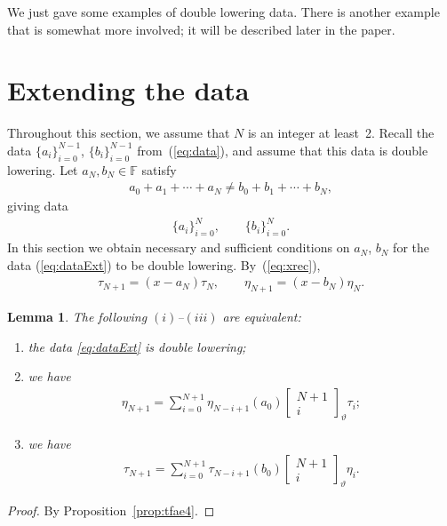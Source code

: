 \documentclass[pdftex]{sigma}
\numberwithin{equation}{section}
\newtheorem{Lemma}[Theorem]{Lemma}
\begin{document}
We just gave some examples of double lowering data. There is another example that is somewhat more involved; it will be described later in the paper.

\section{Extending the data}\label{section7}

Throughout this section, we assume that
$N$ is an integer at least~2.
Recall the data $\lbrace a_i \rbrace_{i=0}^{N-1}$,
$\lbrace b_i \rbrace_{i=0}^{N-1}$ from~(\ref{eq:data}), and assume that this data is double lowering.
Let $a_N, b_N \in \mathbb F$ satisfy
\begin{gather*}
a_0 + a_1 + \cdots + a_N \not=
b_0 + b_1 + \cdots + b_N,
\end{gather*}
giving data
\begin{gather}
\lbrace a_i \rbrace_{i=0}^{N}, \qquad
\lbrace b_i \rbrace_{i=0}^{N}.
\label{eq:dataExt}
\end{gather}
In this section we obtain necessary
and sufficient conditions on $a_N$, $b_N$
for the data (\ref{eq:dataExt}) to be double lowering.
By~(\ref{eq:xrec}),
\begin{gather*}
\tau_{N+1} = (x-a_N)\tau_N, \qquad
\eta_{N+1} = (x-b_N)\eta_N.
\end{gather*}
\begin{Lemma}\label{lem:feas3}
The following $(i)$--$(iii)$ are equivalent:
\begin{enumerate}\itemsep=0pt
\item[$(i)$]
the data \eqref{eq:dataExt}
is double lowering;
\item[$(ii)$]
we have
\begin{gather}
\eta_{N+1} = \sum_{i=0}^{N+1} \eta_{N-i+1} (a_0)
\left[\begin{matrix} N+1 \\
i \end{matrix} \right]_\vartheta \tau_i;\label{eq:etaSumExt}
\end{gather}
\item[$(iii)$] we have
\begin{gather*}
\tau_{N+1} = \sum_{i=0}^{N+1} \tau_{N-i+1} (b_0)
\left[\begin{matrix} N+1 \\
i \end{matrix} \right]_\vartheta \eta_i.%
\end{gather*}
\end{enumerate}
\end{Lemma}
\begin{proof} By Proposition~\ref{prop:tfae4}.
\end{proof}
\end{document}
